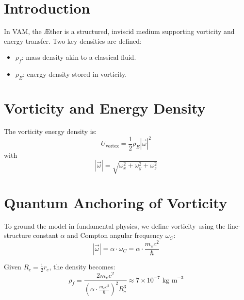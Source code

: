 \documentclass[12pt]{article}
\begin{document}
  \titlepageOpen

  \begin{abstract}
      This article refines previous estimates of the Æther's density, $\rho_{\text{\ae}}$, in the Vortex Æther Model (VAM). Integrating findings from quantum vortex dynamics, superfluid helium, gravitomagnetic frame-dragging, and cosmological vacuum energy, we propose constrained ranges for $\rho_{\scriptscriptstyle\boldsymbol\!f}$ and $\rho_{\scriptscriptstyle\boldsymbol\!E}$ and examine their implications across scales.
  \end{abstract}

  \titlepageClose
\fi


\section{Introduction}

In VAM, the Æther is a structured, inviscid medium supporting vorticity and energy transfer. Two key densities are defined:
\begin{itemize}
    \item $\rho_{\scriptscriptstyle\boldsymbol\!f}$: mass density akin to a classical fluid.
    \item $\rho_{\scriptscriptstyle\boldsymbol\!E}$: energy density stored in vorticity.
\end{itemize}

\section{Vorticity and Energy Density}

The vorticity energy density is:
\[
U_{\text{vortex}} = \frac{1}{2} \rho_{\scriptscriptstyle\boldsymbol\!E} |\vec{\omega}|^2
\]
with
\[
|\vec{\omega}| = \sqrt{\omega_x^2 + \omega_y^2 + \omega_z^2}
\]

\section{Quantum Anchoring of Vorticity}

To ground the model in fundamental physics, we define vorticity using the fine-structure constant $\alpha$ and Compton angular frequency $\omega_C$:
\[
|\vec{\omega}| = \alpha \cdot \omega_C = \alpha \cdot \frac{m_e c^2}{\hbar}
\]

Given $R_c = \frac{1}{2} r_e$, the density becomes:
\[
\rho_{\scriptscriptstyle\boldsymbol\!f} = \frac{2 m_e c^2}{\left(\alpha \cdot \frac{m_e c^2}{\hbar}\right)^2 R_c^3} \approx 7 \times 10^{-7} \text{ kg m}^{-3}
\]
\end{document}
